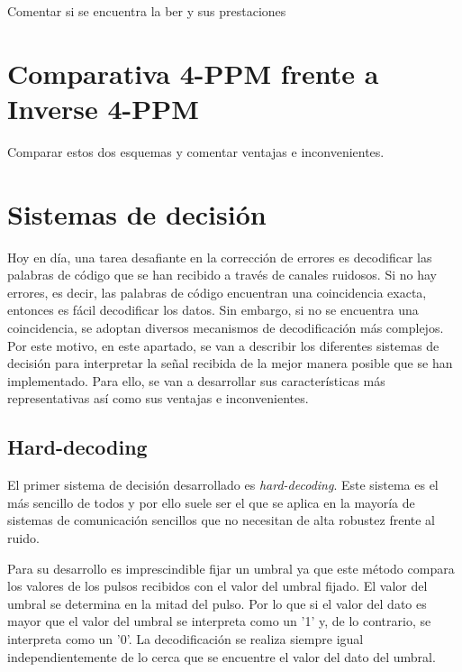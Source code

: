 Comentar si se encuentra la ber y sus prestaciones

\section{Comparativa 4-PPM frente a Inverse 4-PPM}
Comparar estos dos esquemas y comentar ventajas e inconvenientes.

\section{Sistemas de decisión}
Hoy en día, una tarea desafiante en la corrección de errores es decodificar las palabras 
de código que se han recibido a través de canales ruidosos. Si no hay errores, es decir, 
las palabras de código encuentran una coincidencia exacta, entonces es fácil decodificar 
los datos. Sin embargo, si no se encuentra una coincidencia, se adoptan diversos mecanismos
de decodificación más complejos. Por este motivo,
en este apartado, se van a describir los diferentes sistemas de decisión para interpretar 
la señal recibida de la mejor manera posible que se han implementado. Para ello, se van a
desarrollar sus características más representativas así como sus ventajas e inconvenientes.

\subsection{Hard-decoding}
El primer sistema de decisión desarrollado es \textit{hard-decoding}. Este sistema es 
el más sencillo de todos y por ello suele ser el que se aplica en la mayoría de sistemas
de comunicación sencillos que no necesitan de alta robustez frente al ruido.

Para su desarrollo es imprescindible fijar un umbral ya que este método compara los 
valores de los pulsos recibidos con el valor del umbral fijado. El valor del umbral se 
determina en la mitad del pulso. Por lo que si el valor del dato es mayor que el valor 
del umbral se interpreta como un '1' y, de lo contrario, se interpreta como un '0'.
La decodificación se realiza siempre igual independientemente de lo cerca que se encuentre 
el valor del dato del umbral.

